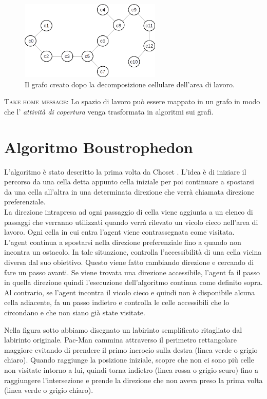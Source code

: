 \documentclass[8pt]{book}
\begin{document}
\begin{figure}
  \centering
  \includegraphics[width=0.6\textwidth]{img/cellDec_grafo.jpg}
    \caption{Il grafo creato dopo la decomposizione cellulare dell'area di lavoro.}
  \label{cellDec_grafo}
\end{figure}

\textsc{Take home message:}  Lo spazio di lavoro può essere mappato in un grafo in modo che l' \emph{attività di copertura} venga trasformata in algoritmi sui grafi.

\section{Algoritmo Boustrophedon}
L'algoritmo è stato descritto la prima volta da Choset \cite{Choset}. L'idea è di iniziare il percorso da una cella detta appunto cella iniziale per poi continuare a spostarsi da una cella all'altra in una determinata direzione che verrà chiamata direzione preferenziale.\\
La direzione intrapresa ad ogni passaggio di cella viene aggiunta a un elenco di passaggi che verranno utilizzati quando verrà rilevato un vicolo cieco nell'area di lavoro. Ogni cella in cui entra l'agent viene contrassegnata come visitata.\\
L'agent continua a spostarsi nella direzione preferenziale fino a quando non incontra un ostacolo. In tale situazione, controlla l'accessibilità di una cella vicina diversa dal suo obiettivo. Questo viene fatto cambiando direzione e cercando di fare un passo avanti. Se viene trovata una direzione accessibile, l'agent fa il passo in quella direzione quindi l'esecuzione dell'algoritmo continua come definito sopra. Al contrario, se l'agent incontra il vicolo cieco e quindi non è disponibile alcuna cella adiacente, fa un passo indietro e controlla le celle accessibili che lo circondano e che non siano già state visitate.\\ \par

Nella figura sotto abbiamo disegnato un labirinto semplificato ritagliato dal labirinto originale. Pac-Man cammina attraverso il  perimetro rettangolare maggiore evitando di prendere il primo incrocio sulla destra (linea verde o grigio chiaro). Quando raggiunge la posizione iniziale, scopre che non ci sono più celle non visitate intorno a lui, quindi torna indietro (linea rossa o grigio scuro) fino a raggiungere l'intersezione e prende la direzione che non aveva preso la prima volta (linea verde o grigio chiaro).\\
\end{document}
